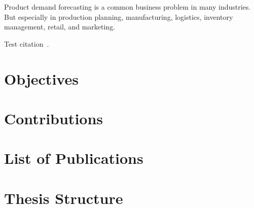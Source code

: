 

Product demand forecasting is a common business problem in many industries.
But especially in production planning, manufacturing, logistics, inventory management, retail, and marketing.

Test citation~\cite{ketkar2017introduction}.

\section[Objectives]{Objectives}




\section[Contributions]{Contributions}


\section[Publications]{List of Publications}




\section[Thesis Structure]{Thesis Structure}


